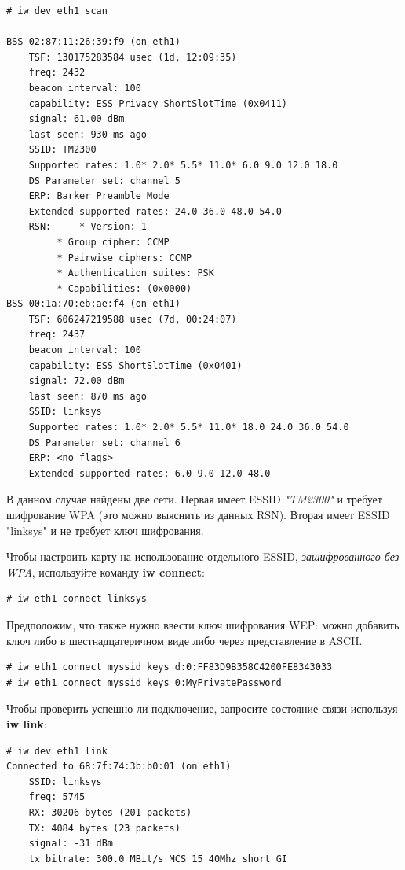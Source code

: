 \documentclass[10pt]{book}
\begin{document}
\begin{tcolorbox}
\begin{lstlisting}
# iw dev eth1 scan

BSS 02:87:11:26:39:f9 (on eth1)
	TSF: 130175283584 usec (1d, 12:09:35)
	freq: 2432
	beacon interval: 100
	capability: ESS Privacy ShortSlotTime (0x0411)
	signal: 61.00 dBm
	last seen: 930 ms ago
	SSID: TM2300
	Supported rates: 1.0* 2.0* 5.5* 11.0* 6.0 9.0 12.0 18.0
	DS Parameter set: channel 5
	ERP: Barker_Preamble_Mode
	Extended supported rates: 24.0 36.0 48.0 54.0
	RSN:	 * Version: 1
		 * Group cipher: CCMP
		 * Pairwise ciphers: CCMP
		 * Authentication suites: PSK
		 * Capabilities: (0x0000)
BSS 00:1a:70:eb:ae:f4 (on eth1)
	TSF: 606247219588 usec (7d, 00:24:07)
	freq: 2437
	beacon interval: 100
	capability: ESS ShortSlotTime (0x0401)
	signal: 72.00 dBm
	last seen: 870 ms ago
	SSID: linksys
	Supported rates: 1.0* 2.0* 5.5* 11.0* 18.0 24.0 36.0 54.0
	DS Parameter set: channel 6
	ERP: <no flags>
	Extended supported rates: 6.0 9.0 12.0 48.0
\end{lstlisting}
\end{tcolorbox}

В данном случае найдены две сети. Первая имеет ESSID \textit{"TM2300"} и требует шифрование WPA (это можно выяснить из данных RSN). Вторая имеет ESSID "linksys"{} и не требует ключ шифрования.

Чтобы настроить карту на использование отдельного ESSID, \textit{зашифрованного без WPA}, используйте команду \textbf{iw connect}:

\begin{tcolorbox}
\begin{lstlisting}
# iw eth1 connect linksys
\end{lstlisting}
\end{tcolorbox}

Предположим, что также нужно ввести ключ шифрования WEP: можно добавить ключ либо в шестнадцатеричном виде либо через представление в ASCII.

\begin{tcolorbox}
\begin{lstlisting}
# iw eth1 connect myssid keys d:0:FF83D9B358C4200FE8343033
# iw eth1 connect myssid keys 0:MyPrivatePassword
\end{lstlisting}
\end{tcolorbox}

Чтобы проверить успешно ли подключение, запросите состояние связи используя \textbf{iw link}:

\begin{tcolorbox}
\begin{lstlisting}
# iw dev eth1 link
Connected to 68:7f:74:3b:b0:01 (on eth1)
	SSID: linksys
	freq: 5745
	RX: 30206 bytes (201 packets)
	TX: 4084 bytes (23 packets)
	signal: -31 dBm
	tx bitrate: 300.0 MBit/s MCS 15 40Mhz short GI
\end{lstlisting}
\end{tcolorbox}
\end{document}
